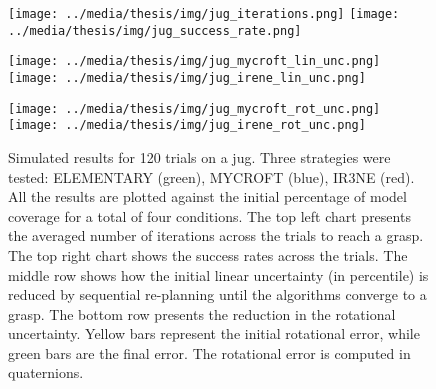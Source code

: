 \begin{figure}[!ht]
\centerline{
\texttt{[image: ../media/thesis/img/jug\_iterations.png]}
\texttt{[image: ../media/thesis/img/jug\_success\_rate.png]}
}
\centerline{
\texttt{[image: ../media/thesis/img/jug\_mycroft\_lin\_unc.png]}
\texttt{[image: ../media/thesis/img/jug\_irene\_lin\_unc.png]}
}
\centerline{
\texttt{[image: ../media/thesis/img/jug\_mycroft\_rot\_unc.png]}
\texttt{[image: ../media/thesis/img/jug\_irene\_rot\_unc.png]}
}

\caption[Simulated results on a jug]{Simulated results for 120 trials on a jug. Three strategies were tested: ELEMENTARY (green), MYCROFT (blue), IR3NE (red). All the results are plotted against the initial percentage of model coverage for a total of four conditions. The top left chart presents the averaged number of iterations across the trials to reach a grasp. The top right chart shows the success rates across the trials. The middle row shows how the initial linear uncertainty (in percentile) is reduced by sequential re-planning until the algorithms converge to a grasp. The bottom row presents the reduction in the rotational uncertainty. Yellow bars represent the initial rotational error, while green bars are the final error. The rotational error is computed in quaternions.}
\label{fig:07:jug_results}
\end{figure}


